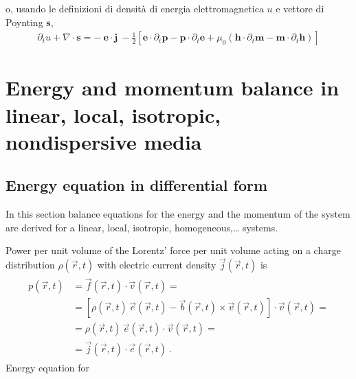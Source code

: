 \documentclass[letterpaper,10pt,english]{jupyterBook}
\begin{document}
\sphinxAtStartPar
o, usando le definizioni di densità di energia elettromagnetica \(u\) e vettore di Poynting \(\mathbf{s}\),
\begin{equation*}
\begin{split}
  \partial_t u + \nabla \cdot \mathbf{s} =
    - \ \mathbf{e} \cdot \mathbf{j} \
    - \frac{1}{2} \left[ \mathbf{e} \cdot \partial_t \mathbf{p} - \mathbf{p} \cdot \partial_t \mathbf{e} + \mu_0 \left(  \mathbf{h} \cdot \partial_t \mathbf{m} - \mathbf{m} \cdot \partial_t \mathbf{h} \right) \right]
\end{split}
\end{equation*}
\sphinxstepscope


\section{Energy and momentum balance in linear, local, isotropic, non\sphinxhyphen{}dispersive media}
\label{\detokenize{ch/energy-momentum-balance:energy-and-momentum-balance-in-linear-local-isotropic-non-dispersive-media}}\label{\detokenize{ch/energy-momentum-balance:classical-electromagnetism-energy-momentum}}\label{\detokenize{ch/energy-momentum-balance::doc}}

\subsection{Energy equation in differential form}
\label{\detokenize{ch/energy-momentum-balance:energy-equation-in-differential-form}}\label{\detokenize{ch/energy-momentum-balance:classical-electromagnetism-energy-momentum-energy-differential}}
\sphinxAtStartPar
In this section balance equations for the energy and the momentum of the system are derived for a linear, local, isotropic, homogeneous,… systems.

\sphinxAtStartPar
Power per unit volume of the Lorentz’ force per unit volume acting on a charge distribution \(\rho(\vec{r},t)\) with electric current density \(\vec{j}(\vec{r},t)\) is
\begin{equation*}
\begin{split}\begin{aligned}
  p(\vec{r},t) 
  & = \vec{f}(\vec{r},t) \cdot \vec{v}(\vec{r},t) = \\
  & = \left[ \rho(\vec{r},t) \, \vec{e}(\vec{r},t) - \vec{b}(\vec{r},t) \times \vec{v}(\vec{r},t) \right] \cdot \vec{v}(\vec{r},t) = \\
  & = \rho(\vec{r},t) \, \vec{e}(\vec{r},t) \cdot \vec{v}(\vec{r},t) = \\
  & = \vec{j}(\vec{r},t) \cdot \vec{e}(\vec{r},t) \ .
\end{aligned}\end{split}
\end{equation*}
\sphinxAtStartPar
{} Energy equation for 
\end{document}
